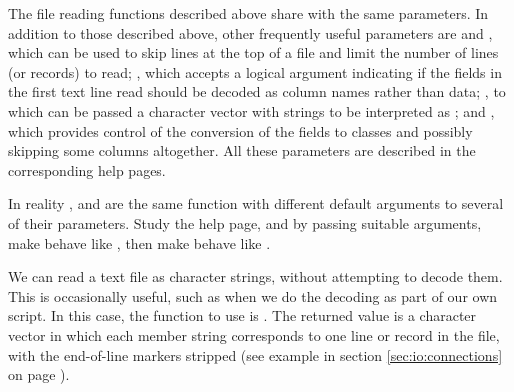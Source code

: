 \documentclass[krantz2]{krantz}\usepackage{knitr}
\begin{document}
\begin{knitrout}\footnotesize
{}\color{fgcolor}\begin{kframe}
\begin{alltt}
\end{alltt}


{\ttfamily\noindent\bfseries\color{errorcolor}{\#\# Error in lapply(X = X, FUN = FUN, ...): object 'from\_fwf\_a.df' not found}}\begin{alltt}
\hlstd{from_fwf_a.df[[}\hlstd{]]}
\end{alltt}


{\ttfamily\noindent\bfseries\color{errorcolor}{\#\# Error in eval(expr, envir, enclos): object 'from\_fwf\_a.df' not found}}\end{kframe}
\end{knitrout}

\begin{explainbox}
  The file reading functions described above share with  the same parameters. In addition to those described above, other frequently useful parameters are  and , which can be used to skip lines at the top of a file and limit the number of lines (or records) to read; , which accepts a logical argument indicating if the fields in the first text line read should be decoded as column names rather than data; , to which can be passed a character vector with strings to be interpreted as ; and , which provides control of the conversion of the fields to \Rlang classes and possibly skipping some columns altogether. All these parameters are described in the corresponding help pages.
\end{explainbox}

\begin{playground}
In reality  ,  and  are the same function with different default arguments to several of their parameters. Study the help page, and by passing suitable arguments, make  behave like , then make  behave like .
\end{playground}

\begin{explainbox}
We can read a text file as character strings, without attempting to decode them. This is occasionally useful, such as when we do the decoding as part of our own script. In this case, the function to use is . The returned value is a character vector in which each member string corresponds to one line or record in the file, with the end-of-line markers stripped (see example in section \ref{sec:io:connections} on page \pageref{sec:io:connections}).
\end{explainbox}
\end{document}
